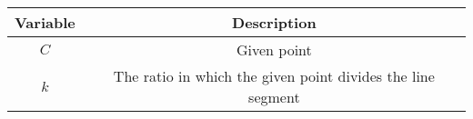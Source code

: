 \begin{tabular}{|c|c|}
        \hline
        Variable & Description \\
        \hline
        $C$ & Given point\\
        \hline
        $k$ & The ratio in which the given point divides the line segment\\
        \hline
\end{tabular}
